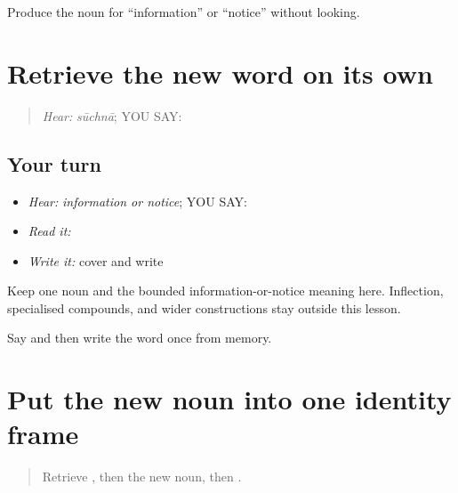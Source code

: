 \begin{tcolorbox}[breakable,colback=teal!4,colframe=teal!35!black,title={Before you move on}]
Produce the noun for “information” or “notice” without looking.
\end{tcolorbox}
\section[\texorpdfstring{\pa{ਸੂਚਨਾ} (suchnaa)}{ਸੂਚਨਾ (suchnaa)}]{Retrieve the new word on its own}

\label{lesson:PA-C199-suchna-review}



\begin{quote}
\emph{Hear:} \emph{sūchnā}; YOU SAY: \textbf{}
\end{quote}

\subsection*{Your turn}
\begin{itemize}
\raggedright
  \item \emph{Hear:} \emph{information or notice}; YOU SAY: \textbf{}
  \item \emph{Read it:} \textbf{}
  \item \emph{Write it:} cover and write \textbf{}
\end{itemize}

\begin{grammarlens}[title={Grammar Lens}]
Keep one noun and the bounded information-or-notice meaning here. Inflection, specialised compounds, and wider constructions stay outside this lesson.
\end{grammarlens}

\begin{tcolorbox}[breakable,colback=teal!4,colframe=teal!35!black,title={Before you move on}]
Say and then write the word once from memory.
\end{tcolorbox}
\section[\texorpdfstring{\pa{ਇਹ} \pa{ਸੂਚਨਾ} \pa{ਹੈ} (eh suchnaa hai)}{ਇਹ ਸੂਚਨਾ ਹੈ (eh suchnaa hai)}]{Put the new noun into one identity frame}

\label{lesson:PA-C199-information-label}



\begin{quote}
Retrieve \textbf{}, then the new noun, then \textbf{}.
\end{quote}

